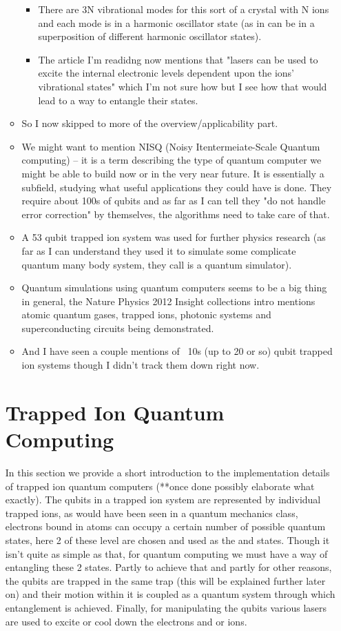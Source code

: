 \begin{itemize}
\begin{itemize}
\begin{itemize}
        \item There are 3N vibrational modes for this sort of a crystal with N ions and each mode is in a harmonic oscillator state (as in can be in a superposition of different harmonic oscillator states).
        \item The article I'm readidng now mentions that "lasers can be used to excite the internal electronic levels dependent upon the ions' vibrational states" which I'm not sure how but I see how that would lead to a way to entangle their states.
    \end{itemize}

    \item So I now skipped to more of the overview/applicability part.
    \item We might want to mention NISQ (Noisy Itentermeiate-Scale Quantum computing) -- it is a term describing the type of quantum computer we might be able to build now or in the very near future.
        It is essentially a subfield, studying what useful applications they could have is done. They require about 100s of qubits and as far as I can tell they "do not handle error correction" by themselves, the algorithms need to take care of that.
    \item A 53 qubit trapped ion system was used for further physics research (as far as I can understand they used it to simulate some complicate quantum many body system, they call is a quantum simulator).
    \item Quantum simulations using quantum computers seems to be a big thing in general, the Nature Physics 2012 Insight collections intro mentions atomic quantum gases, trapped ions, photonic systems and superconducting circuits being demonstrated.
    \item And I have seen a couple mentions of ~10s (up to 20 or so) qubit trapped ion systems though I didn't track them down right now.
\end{itemize}

\section{Trapped Ion Quantum Computing}
In this section we provide a short introduction to the implementation details of trapped ion quantum computers (**once done possibly elaborate what exactly).
The qubits in a trapped ion system are represented by individual trapped ions, as would have been seen in a quantum mechanics class, electrons bound in atoms can occupy a certain number of possible quantum states, here 2 of these level are chosen and used as the \kz and \ko states.
Though it isn't quite as simple as that, for quantum computing we must have a way of entangling these 2 states.
Partly to achieve that and partly for other reasons, the qubits are trapped in the same trap (this will be explained further later on) and their motion within it is coupled as a quantum system through which entanglement is achieved.
Finally, for manipulating the qubits various lasers are used to excite or cool down the electrons and or ions.


\end{itemize}
